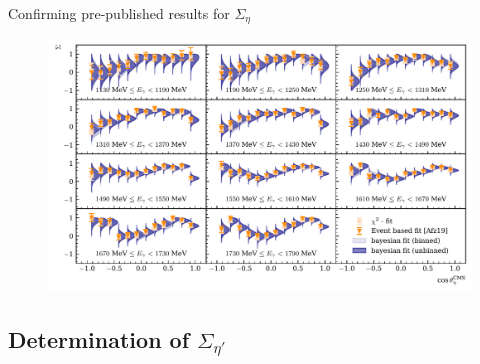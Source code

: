\documentclass[11pt,aspectratio=169,dvipsnames]{beamer}
\begin{document}
	\begin{frame}{Confirming pre-published results for $\Sigma_\eta$}
		\begin{figure}
			\centering
			\includegraphics[width=.95\linewidth]{../../bayes/event_based_fit/plots/sigma_eta.pdf}
		\end{figure}
	\end{frame}
	
	
	
	
	\subsection{Determination of $\Sigma_{\eta'}$}
	
\end{document}
